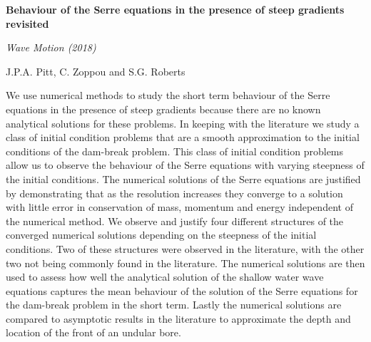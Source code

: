 \begin{center}
	\textbf{
		\Large Behaviour of the Serre equations in the presence of steep
		gradients revisited}
	
	\vspace*{\baselineskip}
	
	\textit{Wave Motion (2018)}
	
	{J.P.A. Pitt, C. Zoppou and S.G. Roberts}
	\vspace*{0.5\baselineskip}
\end{center}
We use numerical methods to study the short term behaviour of the Serre equations in
the presence of steep gradients because there are no known analytical solutions for these
problems. In keeping with the literature we study a class of initial condition problems that
are a smooth approximation to the initial conditions of the dam-break problem. This class
of initial condition problems allow us to observe the behaviour of the Serre equations
with varying steepness of the initial conditions. The numerical solutions of the Serre
equations are justified by demonstrating that as the resolution increases they converge
to a solution with little error in conservation of mass, momentum and energy independent
of the numerical method. We observe and justify four different structures of the converged
numerical solutions depending on the steepness of the initial conditions. Two of these
structures were observed in the literature, with the other two not being commonly found
in the literature. The numerical solutions are then used to assess how well the analytical
solution of the shallow water wave equations captures the mean behaviour of the solution
of the Serre equations for the dam-break problem in the short term. Lastly the numerical
solutions are compared to asymptotic results in the literature to approximate the depth
and location of the front of an undular bore.


	
